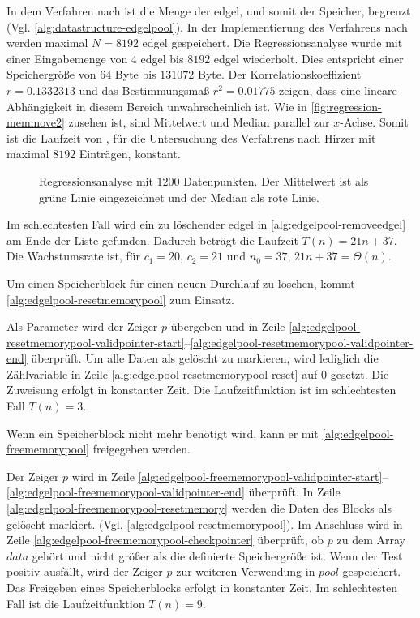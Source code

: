 In dem Verfahren nach \citeauthor{hirzer08} ist die Menge der \gls{edgel}, und somit der Speicher, begrenzt
 (Vgl. \autoref{alg:datastructure-edgelpool}). In der Implementierung des Verfahrens nach \citeauthor{hirzer08} werden
 maximal $N = 8192$ \gls{edgel} gespeichert. Die Regressionsanalyse wurde mit einer Eingabemenge von $4$ \gls{edgel}
 bis $8192$ \gls{edgel} wiederholt. Dies entspricht einer Speichergröße von $64$ Byte bis $131072$ Byte. Der
 Korrelationskoeffizient $r = 0.1332313$ und das Bestimmungsmaß $r^2 = 0.01775$ zeigen, dass eine lineare Abhängigkeit
 in diesem Bereich unwahrscheinlich ist. Wie in \autoref{fig:regression-memmove2} zusehen ist, sind Mittelwert und
 Median parallel zur $x$-Achse. Somit ist die Laufzeit von , für die Untersuchung des Verfahrens nach
 Hirzer mit maximal $8192$ Einträgen, konstant.
\begin{figure}[!ht]
	\centering
	
	\caption{Regressionsanalyse mit $1200$ Datenpunkten. Der Mittelwert ist als grüne Linie eingezeichnet und der
	 Median als rote Linie.}
	\label{fig:regression-memmove2}
\end{figure}
Im schlechtesten Fall wird ein zu löschender \gls{edgel} in \autoref{alg:edgelpool-removeedgel} am Ende der Liste
 gefunden. Dadurch beträgt die Laufzeit $T(n) = 21n + 37$. Die Wachstumsrate ist, für $c_{1} = 20$, $c_{2} = 21$ und
 $n_{0} = 37$, $21n + 37= \Theta(n)$.

Um einen Speicherblock für einen neuen Durchlauf zu löschen, kommt \autoref{alg:edgelpool-resetmemorypool} zum Einsatz.

 Als Parameter wird der Zeiger $p$ übergeben und in Zeile
 \ref{alg:edgelpool-resetmemorypool-validpointer-start}--\ref{alg:edgelpool-resetmemorypool-validpointer-end}
 überprüft. Um alle Daten als gelöscht zu markieren, wird lediglich die Zählvariable in Zeile
 \ref{alg:edgelpool-resetmemorypool-reset} auf $0$ gesetzt. Die Zuweisung erfolgt in konstanter Zeit. Die
 Laufzeitfunktion ist im schlechtesten Fall $T(n) = 3$.

Wenn ein Speicherblock nicht mehr benötigt wird, kann er mit \autoref{alg:edgelpool-freememorypool} freigegeben werden.

 Der Zeiger $p$ wird in Zeile
 \ref{alg:edgelpool-freememorypool-validpointer-start}--\ref{alg:edgelpool-freememorypool-validpointer-end} überprüft.
 In Zeile \ref{alg:edgelpool-freememorypool-resetmemory} werden die Daten des Blocks als gelöscht markiert.
 (Vgl. \autoref{alg:edgelpool-resetmemorypool}). Im Anschluss wird in Zeile
 \ref{alg:edgelpool-freememorypool-checkpointer} überprüft, ob $p$ zu dem Array $\mathit{data}$ gehört und nicht größer
 als die definierte Speichergröße ist. Wenn der Test positiv ausfällt, wird der Zeiger $p$ zur weiteren Verwendung in
 $\mathit{pool}$ gespeichert. Das Freigeben eines Speicherblocks erfolgt in konstanter Zeit. Im schlechtesten Fall ist
 die Laufzeitfunktion $T(n) = 9$.

